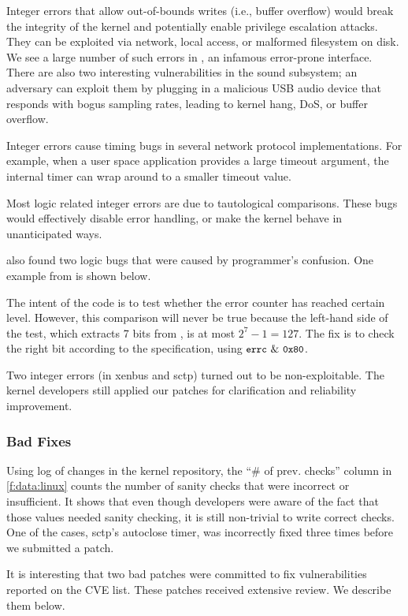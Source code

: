 Integer errors that allow out-of-bounds writes (i.e., buffer
overflow) would break the integrity of the kernel and potentially
enable privilege escalation attacks.  They can be exploited via network,
local access, or malformed filesystem on disk.  We see a large number of
such errors in , an infamous error-prone interface.
%
There are also two interesting vulnerabilities in the sound subsystem;
an adversary can exploit them by plugging in a malicious USB audio
device that responds with bogus sampling rates, leading to kernel
hang, DoS, or buffer overflow.

Integer errors cause timing bugs in several network protocol
implementations.  For example, when a user space application provides
a large timeout argument, the internal timer can wrap around
to a smaller timeout value.

Most logic related integer errors are due to tautological comparisons.
These bugs would effectively disable error handling, or make the kernel
behave in unanticipated ways. 

\sys also found two logic bugs that were caused by programmer's
confusion. One example from  is shown below.

The intent of the code is to test whether the error counter 
has reached certain level.  However, this
comparison will never be true because the left-hand side of the test,
which extracts 7 bits from , is at most
$2^7 - 1 = 127$.  The fix is to check the right bit according to the
specification, using $\cc{errc}\ \&\ \cc{0x80}$.

Two integer errors (in xenbus and sctp) turned out
to be non-exploitable.  The kernel developers still applied our
patches for clarification and reliability improvement.

\subsubsection{Bad Fixes}
\label{s:eval:bad}

Using log of changes in the kernel repository,
the ``\# of prev. checks'' column in \autoref{f:data:linux} counts
the number of sanity checks that were incorrect or insufficient.
It shows that even though developers were aware of the fact that
those values needed sanity checking, it is still non-trivial
to write correct checks.
One of the cases, sctp's autoclose timer, was incorrectly fixed
three times before we submitted a patch.

%
It is interesting that two bad patches were committed to fix
vulnerabilities reported on the CVE list. These patches received extensive
review.  We describe them below.


